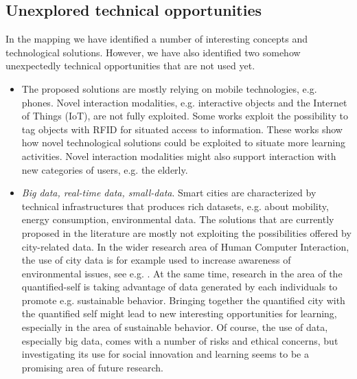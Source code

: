 \subsection*{Unexplored technical opportunities}
In the mapping we have identified a number of interesting concepts and technological solutions. However, we have also identified two somehow unexpectedly technical opportunities that are not used yet.
\begin{itemize}
\item The proposed solutions are mostly relying on mobile technologies, e.g. phones. Novel interaction modalities, e.g. interactive objects and the Internet of Things (IoT), are not fully exploited. Some works exploit the possibility to tag objects with RFID for situated access to information\cite{kashtan_outdoors_2013}. These works show how novel technological solutions could be exploited to situate more learning activities. Novel interaction modalities might also support interaction with new categories of users, e.g. the elderly.
\item \textit{Big data, real-time data, small-data}. Smart cities are characterized by technical infrastructures that produces rich datasets, e.g. about mobility, energy consumption, environmental data. The solutions that are currently proposed in the literature are mostly not exploiting the possibilities offered by city-related data. In the wider research area of Human Computer Interaction, the use of city data is for example used to increase awareness of environmental issues, see e.g. \cite{kashtan_outdoors_2013}. At the same time, research in the area of the quantified-self is taking advantage of data generated by each individuals to promote e.g. sustainable behavior. Bringing together the quantified city with the quantified self might lead to new interesting opportunities for learning, especially in the area of sustainable behavior. Of course, the use of data, especially big data, comes with a number of risks and ethical concerns, but investigating its use for social innovation and learning seems to be a promising area of future research.
\end{itemize}
